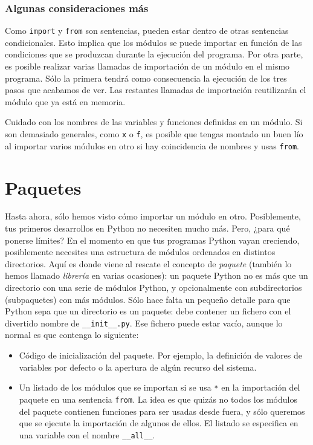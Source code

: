 {\subsubsection{Algunas consideraciones más}

Como \texttt{import} y \texttt{from} son sentencias, pueden estar dentro de otras sentencias condicionales. Esto implica que los módulos se puede importar en función de las condiciones que se produzcan durante la ejecución del programa. Por otra parte, es posible realizar varias llamadas de importación de un módulo en el mismo programa. Sólo la primera tendrá como consecuencia la ejecución de los tres pasos que acabamos de ver. Las restantes llamadas de importación reutilizarán el módulo que ya está en memoria.

Cuidado con los nombres de las variables y funciones definidas en un módulo. Si son demasiado generales, como \texttt{x} o \texttt{f}, es posible que tengas montado un buen lío al importar varios módulos en otro si hay coincidencia de nombres y usas \texttt{from}.

\section{Paquetes}

Hasta ahora, sólo hemos visto cómo importar un módulo en otro. Posiblemente, tus primeros desarrollos en Python no necesiten mucho más. Pero, ¿para qué ponerse límites? En el momento en que tus programas Python vayan creciendo, posiblemente necesites una estructura de módulos ordenados en distintos directorios. Aquí es donde viene al rescate el concepto de \emph{paquete} (también lo hemos llamado \emph{librería} en varias ocasiones): un paquete Python no es más que un directorio con una serie de módulos Python, y opcionalmente con subdirectorios (subpaquetes) con más módulos. Sólo hace falta un pequeño detalle para que Python sepa que un directorio es un paquete: debe contener un fichero con el divertido nombre de \texttt{\_\_init\_\_.py}. Ese fichero puede estar vacío, aunque lo normal es que contenga lo siguiente:

\begin{itemize}
\item Código de inicialización del paquete. Por ejemplo, la definición de valores de variables por defecto o la apertura de algún recurso del sistema.
\item Un listado de los módulos que se importan si se usa \texttt{*} en la importación del paquete en una sentencia \texttt{from}. La idea es que quizás no todos los módulos del paquete contienen funciones para ser usadas desde fuera, y sólo queremos que se ejecute la importación de algunos de ellos. El listado se especifica en una variable con el nombre \texttt{\_\_all\_\_}.
\end{itemize}

}
